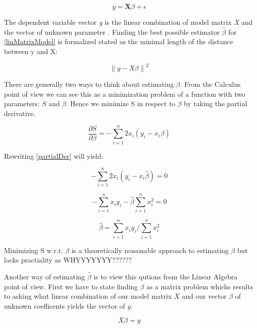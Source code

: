 \documentclass{article}
\begin{document}
    \begin{equation}  \label{linMatrixModel} y =  \mathbf{X} \beta +\epsilon \end{equation}

     The dependent  variable vector \textit{y} is the linear combination of model matrix \textit{X} and the vector of unknown parameter \textbeta. Finding the best possible estimator $\widehat{\beta}$ for \ref{linMatrixModel} is formalized stated as the minimal length of the distance between y and X\textbeta:

    \begin{equation} \label{matrixLOSS} \left \| y - X\beta  \right \|^2 \end{equation}

    There are generally two ways to think about estimating $\beta$. From the Calculus point of view we can see this as a minimization problem of a function with two parameters: $S$ and $\beta$. Hence we minimize S in respect to $\beta$ by taking the partial derivative.

    \begin{equation} \label{partialDer} \frac{\partial S}{\partial \beta} = - \sum_{i=1}^{n} 2x_i(y_i-x_i\beta) \end{equation}

    Rewriting \ref{partialDer} will yield:

    \begin{equation}  - \sum_{i=1}^{n} 2x_i(y_i-x_i\widehat{\beta}) = 0  \end{equation}

    \begin{equation} - \sum_{i=1}^{n} x_iy_i-\widehat{\beta} \sum_{i=1}^{n} x_i^2 = 0  \end{equation}

    \begin{equation} \widehat{\beta} = \sum_{i=1}^{n} x_iy_i /\sum_{i=1}^{n} x_i^2 \end{equation}

    Minimizing S w.r.t. $\beta$ is a theoretically reasonable approach to estimating $\beta$ but lacks practiality as WHYYYYYYY??????

    Another way of estimating $\widehat{\beta}$ is to view this qutions from the Linear Algebra point of view. First we have to state finding $\beta$ as a matrix problem whichs results to asking what linear combination of our model matrix $X$ and our vector $\beta$ of unknown coefficents yields the vector of $y$.

    \begin{equation} X\beta = y \end{equation}
\end{document}
